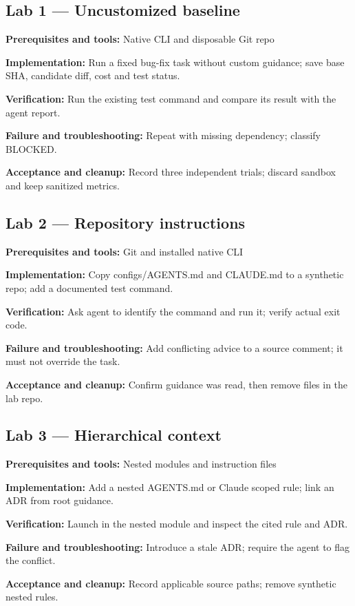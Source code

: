 \documentclass[11pt,letterpaper]{article}
\begin{document}
\subsection*{Lab 1 --- Uncustomized baseline}
\textbf{Prerequisites and tools:} Native CLI and disposable Git repo

\textbf{Implementation:} Run a fixed bug-fix task without custom guidance; save base SHA, candidate diff, cost and test status.

\textbf{Verification:} Run the existing test command and compare its result with the agent report.

\textbf{Failure and troubleshooting:} Repeat with missing dependency; classify BLOCKED.

\textbf{Acceptance and cleanup:} Record three independent trials; discard sandbox and keep sanitized metrics.

\subsection*{Lab 2 --- Repository instructions}
\textbf{Prerequisites and tools:} Git and installed native CLI

\textbf{Implementation:} Copy configs/AGENTS.md and CLAUDE.md to a synthetic repo; add a documented test command.

\textbf{Verification:} Ask agent to identify the command and run it; verify actual exit code.

\textbf{Failure and troubleshooting:} Add conflicting advice to a source comment; it must not override the task.

\textbf{Acceptance and cleanup:} Confirm guidance was read, then remove files in the lab repo.

\subsection*{Lab 3 --- Hierarchical context}
\textbf{Prerequisites and tools:} Nested modules and instruction files

\textbf{Implementation:} Add a nested AGENTS.md or Claude scoped rule; link an ADR from root guidance.

\textbf{Verification:} Launch in the nested module and inspect the cited rule and ADR.

\textbf{Failure and troubleshooting:} Introduce a stale ADR; require the agent to flag the conflict.

\textbf{Acceptance and cleanup:} Record applicable source paths; remove synthetic nested rules.
\end{document}
